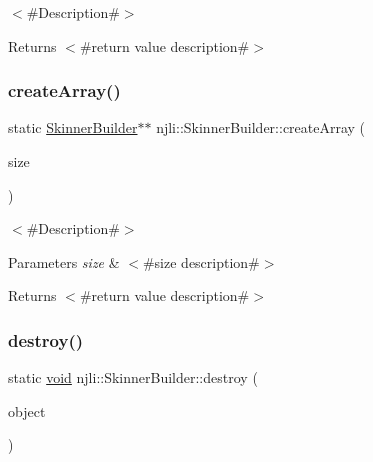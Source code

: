 $<$\#\+Description\#$>$

\begin{DoxyReturn}{Returns}
$<$\#return value description\#$>$ 
\end{DoxyReturn}
\mbox{\label{classnjli_1_1_skinner_builder_a8344d2b1a58676136d3fa122d4d38529}} 
\subsubsection{\texorpdfstring{create\+Array()}{createArray()}}
{\footnotesize\ttfamily static \mbox{\hyperlink{classnjli_1_1_skinner_builder}{Skinner\+Builder}}$\ast$$\ast$ njli\+::\+Skinner\+Builder\+::create\+Array (\begin{DoxyParamCaption}\item[{const \mbox{\hyperlink{_util_8h_a10e94b422ef0c20dcdec20d31a1f5049}{u32}}}]{size }\end{DoxyParamCaption})\hspace{0.3cm}{\ttfamily [static]}}

$<$\#\+Description\#$>$


\begin{DoxyParams}{Parameters}
{\em size} & $<$\#size description\#$>$\\
\hline
\end{DoxyParams}
\begin{DoxyReturn}{Returns}
$<$\#return value description\#$>$ 
\end{DoxyReturn}
\mbox{\label{classnjli_1_1_skinner_builder_ab2433bcdd5d80f4e829a0636e3e3f3d3}} 
\subsubsection{\texorpdfstring{destroy()}{destroy()}}
{\footnotesize\ttfamily static \mbox{\hyperlink{_thread_8h_af1e856da2e658414cb2456cb6f7ebc66}{void}} njli\+::\+Skinner\+Builder\+::destroy (\begin{DoxyParamCaption}\item[{\mbox{\hyperlink{classnjli_1_1_skinner_builder}{Skinner\+Builder}} $\ast$}]{object }\end{DoxyParamCaption})\hspace{0.3cm}{\ttfamily [static]}}

